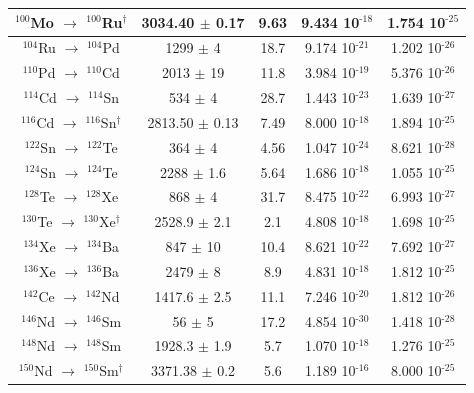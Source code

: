 \documentclass[main.tex]{subfiles}
\begin{document}
\begin{table}
\begin{tabular}{|c|c|c|c|c|}
\hline
$^{\text{100}}$Mo $\rightarrow$ $^{\text{100}}$Ru$^{\dagger}$ & 3034.40   $\pm$ 0.17   & 9.63   & 9.434 10$^{\text{-18}}$ & 1.754 10$^{\text{-25}}$\\ 
\hline
$^{\text{104}}$Ru $\rightarrow$ $^{\text{104}}$Pd & 1299   $\pm$ 4   & 18.7   & 9.174 10$^{\text{-21}}$ & 1.202 10$^{\text{-26}}$\\ 
\hline
$^{\text{110}}$Pd $\rightarrow$ $^{\text{110}}$Cd & 2013   $\pm$ 19  & 11.8   & 3.984 10$^{\text{-19}}$ & 5.376 10$^{\text{-26}}$\\ 
\hline
$^{\text{114}}$Cd $\rightarrow$ $^{\text{114}}$Sn & 534    $\pm$ 4   & 28.7   & 1.443 10$^{\text{-23}}$ & 1.639 10$^{\text{-27}}$\\ 
\hline
$^{\text{116}}$Cd $\rightarrow$ $^{\text{116}}$Sn$^{\dagger}$ & 2813.50 $\pm$ 0.13   & 7.49   & 8.000 10$^{\text{-18}}$ & 1.894 10$^{\text{-25}}$\\ 
\hline
$^{\text{122}}$Sn $\rightarrow$ $^{\text{122}}$Te & 364    $\pm$ 4   & 4.56   & 1.047 10$^{\text{-24}}$ & 8.621 10$^{\text{-28}}$\\ 
\hline
$^{\text{124}}$Sn $\rightarrow$ $^{\text{124}}$Te & 2288   $\pm$ 1.6 & 5.64   & 1.686 10$^{\text{-18}}$ & 1.055 10$^{\text{-25}}$\\ 
\hline
$^{\text{128}}$Te $\rightarrow$ $^{\text{128}}$Xe & 868    $\pm$ 4   & 31.7   & 8.475 10$^{\text{-22}}$ & 6.993 10$^{\text{-27}}$\\ 
\hline
$^{\text{130}}$Te $\rightarrow$ $^{\text{130}}$Xe$^{\dagger}$ & 2528.9 $\pm$ 2.1 & 2.1   & 4.808 10$^{\text{-18}}$ & 1.698 10$^{\text{-25}}$\\ 
\hline
$^{\text{134}}$Xe $\rightarrow$ $^{\text{134}}$Ba & 847    $\pm$ 10  & 10.4   & 8.621 10$^{\text{-22}}$ & 7.692 10$^{\text{-27}}$\\ 
\hline
$^{\text{136}}$Xe $\rightarrow$ $^{\text{136}}$Ba & 2479   $\pm$ 8   & 8.9    & 4.831 10$^{\text{-18}}$ & 1.812 10$^{\text{-25}}$\\ 
\hline
$^{\text{142}}$Ce $\rightarrow$ $^{\text{142}}$Nd & 1417.6 $\pm$ 2.5 & 11.1   & 7.246 10$^{\text{-20}}$ & 1.812 10$^{\text{-26}}$\\
\hline 
$^{\text{146}}$Nd $\rightarrow$ $^{\text{146}}$Sm & 56     $\pm$ 5   & 17.2   & 4.854 10$^{\text{-30}}$ & 1.418 10$^{\text{-28}}$\\
\hline 
$^{\text{148}}$Nd $\rightarrow$ $^{\text{148}}$Sm & 1928.3 $\pm$ 1.9 & 5.7    & 1.070 10$^{\text{-18}}$ & 1.276 10$^{\text{-25}}$\\
\hline 
$^{\text{150}}$Nd $\rightarrow$ $^{\text{150}}$Sm$^{\dagger}$ & 3371.38 $\pm$ 0.2 & 5.6    & 1.189 10$^{\text{-16}}$ & 8.000 10$^{\text{-25}}$\\ 

\end{tabular}
\end{table}
\end{document}

